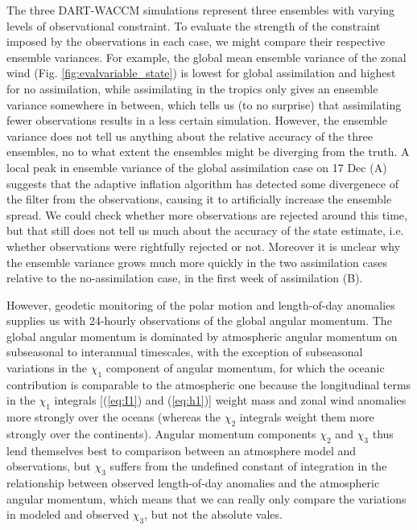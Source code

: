 The three DART-WACCM simulations represent three ensembles with varying levels of observational constraint. 
To evaluate the strength of the constraint imposed by the observations in each case, we might compare their respective ensemble variances. 
For example, the global mean ensemble variance of the zonal wind (Fig. \ref{fig:evalvariable_state}) 
is lowest for global assimilation and highest for no assimilation, while assimilating in the tropics only gives an ensemble variance somewhere in between,
which tells us (to no surprise) that assimilating fewer observations results in a less certain simulation.
However, the ensemble variance does not tell us anything about the relative accuracy of the three ensembles, no to what extent the ensembles might be diverging from the truth. 
A local peak in ensemble variance of the global assimilation case on 17 Dec (A) suggests that the adaptive inflation algorithm has detected some divergenece of the filter from the observations, causing it to artificially increase the ensemble spread. 
We could check whether more observations are rejected around this time, but that still does not tell us much about the accuracy of the state estimate, i.e. whether observations were rightfully rejected or not. 
Moreover it is unclear why the ensemble variance grows much more quickly in the two assimilation cases relative to the no-assimilation case, in the first week of assimilation (B).   

However, geodetic monitoring of the polar motion and length-of-day anomalies
supplies us with 24-hourly observations of the global
angular momentum.
The global angular momentum is dominated by atmospheric angular momentum on subseasonal to interannual timescales, with the exception of subseasonal variations in the $\chi_1$ component of angular momentum, for which the oceanic contribution is comparable to the atmospheric one 
because the 
longitudinal terms in the $\chi_1$ integrals [(\ref{eq:I1}) and (\ref{eq:h1})] weight mass and zonal wind anomalies more strongly over the oceans (whereas the $\chi_2$ integrals weight them more strongly over the continents).
Angular momentum components $\chi_2$ and $\chi_3$ thus lend themselves best to comparison between an atmosphere model and observations, but 
$\chi_3$ 
suffers from the undefined constant of integration in the relationship between observed length-of-day anomalies and the atmospheric angular momentum, which means that
we can really only compare the variations in modeled and observed $\chi_3$, but not the absolute vales. 

